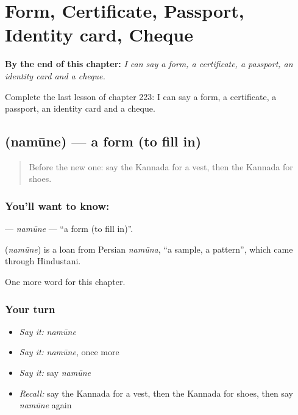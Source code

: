 
\chapter{Form, Certificate, Passport, Identity card, Cheque}
\label{ch:ka-form-certificate-passport-identity-card-cheque}

\begin{chapteropening}
\textbf{By the end of this chapter:} \emph{I can say a form, a certificate, a passport, an identity card and a cheque.}

Complete the last lesson of chapter 223: I can say a form, a certificate, a passport, an identity card and a cheque.
\end{chapteropening}

\section[\texorpdfstring{\kn{ನಮೂನೆ} (namūne)}{ನಮೂನೆ (namūne)}]{ (namūne) — a form (to fill in)}

\label{lesson:KA-C223-namune}



\begin{quote}
Before the new one: say the Kannada for a vest, then the Kannada for shoes.
\end{quote}

\subsection*{You'll want to know: }
\textbf{} — \emph{namūne} — \textquotedblleft{}a form (to fill in)\textquotedblright{}.

\begin{cousinweb}
\textbf{} (\emph{namūne}) is a loan from Persian \emph{namūna}, \textquotedblleft{}a sample, a pattern\textquotedblright{}, which came through Hindustani.
\end{cousinweb}

\begin{grammarlens}[title={What you've built}]
One more word for this chapter.
\end{grammarlens}

\subsection*{Your turn}
\begin{itemize}
\raggedright
  \item \emph{Say it:} \emph{namūne}
  \item \emph{Say it:} \emph{namūne}, once more
  \item \emph{Say it:} say \emph{namūne}
  \item \emph{Recall:} say the Kannada for a vest, then the Kannada for shoes, then say \emph{namūne} again
\end{itemize}

